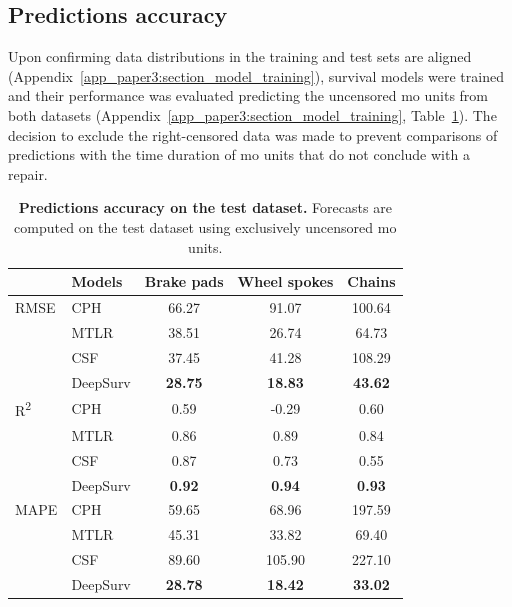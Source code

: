 \subsection{Predictions accuracy}

    Upon confirming data distributions in the training and test sets are aligned (Appendix~\ref{app_paper3:section_model_training}), survival models were trained and their performance was evaluated predicting the uncensored \ac{mo} units from both datasets (Appendix~\ref{app_paper3:section_model_training}, Table~\ref{tab:prediction_results_test}). The decision to exclude the right-censored data was made to prevent comparisons of predictions with the time duration of \ac{mo} units that do not conclude with a repair.

    \begin{table}[htbp!]
        \centering
        \footnotesize
        \caption[Prediction accuracy on the test dataset]{
            \textbf{Predictions accuracy on the test dataset.} 
            Forecasts are computed on the test dataset using exclusively uncensored \ac{mo} units.
        }
        \label{tab:prediction_results_test}
        \begin{tabular}{llccc}
            \toprule
                                & Models   & Brake pads     & Wheel spokes   & Chains \\
            \midrule
            RMSE                & CPH      & 66.27          & 91.07          & 100.64 \\
                                & MTLR     & 38.51          & 26.74          & 64.73 \\
                                & CSF      & 37.45          & 41.28          & 108.29 \\
                                & DeepSurv & \textbf{28.75} & \textbf{18.83} & \textbf{43.62} \\
            \midrule
            R\textsuperscript{2} & CPH      & 0.59           & -0.29          & 0.60 \\
                                 & MTLR     & 0.86           & 0.89           & 0.84 \\
                                 & CSF      & 0.87           & 0.73           & 0.55 \\
                                 & DeepSurv & \textbf{0.92}  & \textbf{0.94}  & \textbf{0.93} \\
            \midrule
            MAPE                 & CPH      & 59.65          & 68.96          & 197.59 \\
                                 & MTLR     & 45.31          & 33.82          & 69.40 \\
                                 & CSF      & 89.60          & 105.90         & 227.10 \\
                                 & DeepSurv & \textbf{28.78} & \textbf{18.42} & \textbf{33.02} \\
            \bottomrule
        \end{tabular}
        \end{table}

